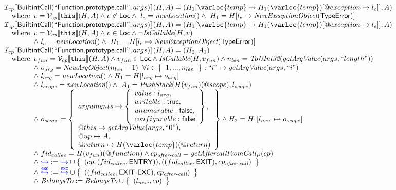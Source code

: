 \[
\begin{array}{l}
\I _{cp}\lbr \SF{BuiltintCall}(``\SF{Function.prototype.call}",args)\rbr(H,A)
 = (H_1[\varloc{temp}\mapsto H_1(\varloc{temp})[\varprop{exception}\mapsto l_e]], A) \\
\quad\wherec{
  v = \V _{cp}\lbr \TT{this}\rbr (H,A) \land v \not\in \SF{Loc}
  \land\ l_e = \hf{newLocation}() \land\ H_1=H[l_e\mapsto\hf{NewExceptionObject}(\SF{TypeError})] 
  }\\
  \I _{cp}\lbr \SF{BuiltintCall}(``\SF{Function.prototype.call}",args)\rbr(H,A)

 = (H_1[\varloc{temp}\mapsto H_1(\varloc{temp})[\varprop{exception}\mapsto l_e]], A) \\
\quad\wherec{
  v = \V _{cp}\lbr \TT{this}\rbr (H,A) \land v \in \SF{Loc} \land \neg \hf{IsCallable}(H,v)\\
  \land\ l_e = \hf{newLocation}() \land\ H_1=H[l_e\mapsto\hf{NewExceptionObject}(\SF{TypeError})] 
  }\\
  
\I _{cp}\lbr \SF{BuiltintCall}(``\SF{Function.prototype.call}",args)\rbr(H,A) = (H_2, A_1) \\
\quad\wherec{
  v_{fun} = \V _{cp}\lbr \TT{this}\rbr (H,A) \land v_{fun} \in \SF{Loc} \land \hf{IsCallable}(H,v_{fun})
  \land n_{len} = \hf{ToUInt32}(\hf{getArgValue}(args, ``length"))\\
  \land\ o_{arg} = \hf{NewArgObject}(n_{len}-1)\left[ \forall i \in \set{1, ..., n_{len}}: 
    ``i" \mapsto \hf{getArgValue}(args, ``i") \right] \\
  \land\ l_{arg} = \hf{newLocation}()\land H_1 = H[l_{arg} \mapsto o_{arg}]\\
  \land\ l_{scope} = \hf{newLocation}()
  \land\ A_1=\hf{PushStack}(H(v_{fun})(\varprop{scope}),l_{scope}) \\
  \land\ o_{scope} = \set{
    arguments \mapsto \set{value : l_{arg},\\ 
      writable : \SF{true},\\ unumarable : \SF{false},\\ configurable : \SF{false}},\\
    \varprop{this} \mapsto \hf{getArgValue}(args, ``0"),\\
    \varprop{up} \mapsto A,\\
    \varprop{return} \mapsto H(\varloc{temp})(\varprop{return})}
  \land H_2 = H_1[l_{new} \mapsto o_{scope}]\\
  \land\ fid_{callee}= H(v_{fun})(\varprop{function})
  \land cp_{\textit{after-call}} = \hf{getAftercallFromCall}_P(cp) \\
  \land\ {\inblue \cfgnext} :=
  {\inblue \cfgnext}\cup\set{( cp,(fid_{callee},\SF{ENTRY})),
    ((fid_{callee},\SF{EXIT}), cp_{\textit{after-call}})}\\
  \land\ {\inblue \excnext}:={\inblue \excnext}
  \cup\set{((fid_{callee},\SF{EXIT-EXC}), cp_{\textit{after-call}})}\\
  \land\ \hf{BelongsTo}:=\hf{BelongsTo}\cup\set{(l_{new},cp)}
} \\
\\\\




\end{array}\]
